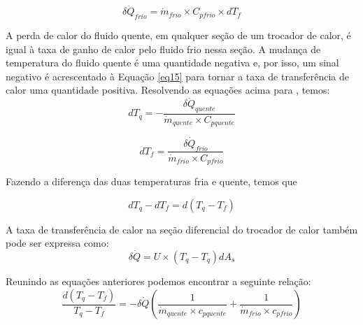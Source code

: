 \documentclass[a4paper,12pt,oneside]{article}
\begin{document}
\begin{flushright}
\begin{equation}\label{eq16}
	\delta \dot{Q}_{frio} = \dot{m}_{frio} \times C_{pfrio} \times dT_{f}
\end{equation}
\vspace{0.5cm}

A perda de calor do fluido quente, em qualquer seção de um trocador de calor, é igual à taxa de ganho de calor pelo fluido frio nessa seção. A mudança de temperatura do fluido quente é uma quantidade negativa e, por isso, um sinal negativo é acrescentado à Equação \ref{eq15} para tornar a taxa de transferência de calor uma quantidade positiva. Resolvendo as equações acima para , temos:\\

\begin{equation}\label{eq17}
dT_{q} = -  \frac{\delta \dot{Q}_{quente}}{\dot{m}_{quente} \times C_{pquente}}
\end{equation}
\vspace{0.5cm}

\begin{equation}\label{eq18}
dT_{f} = \frac{\delta \dot{Q}_{frio}}{\dot{m}_{frio} \times C_{pfrio}}
\end{equation}
\vspace{0.5cm}

Fazendo a diferença das duas temperaturas fria e quente, temos que 

\begin{equation}\label{eq19}
dT_{q} - dT_{f} = d(T_{q} - T_{f})
\end{equation}
\vspace{0.5cm}

A taxa de transferência de calor na seção diferencial do trocador de calor também pode ser expressa como:\\

\begin{equation}\label{eq20}
	\delta \dot{Q} = U \times (T_{q} - T_{q})dA_{s}
\end{equation}
\vspace{0.5cm}

Reunindo as equações anteriores podemos encontrar a seguinte relação:\\

\begin{equation}\label{eq21}
	\frac{d(T_{q} - T_{f})}{T_{q} - T_{f}} = -\delta\dot{Q} \left(  \frac{1}{\dot{m}_{quente} \times c_{pquente}} + \frac{1}{\dot{m}_{frio} \times c_{pfrio}}  \right)  
		\end{equation}
		\vspace{0.5cm}


\end{flushright}
\end{document}
